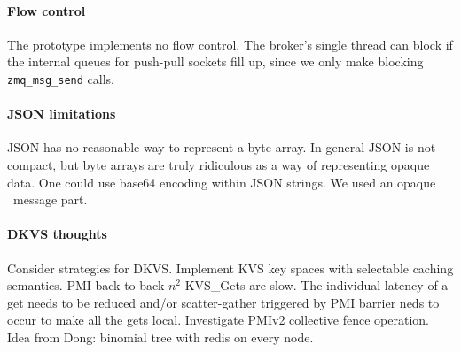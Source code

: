 \paragraph{Flow control}  The prototype implements no flow control.
The broker's single thread can block if the internal queues for push-pull
sockets fill up, since we only make blocking {\tt zmq\_msg\_send} calls.

\paragraph{JSON limitations}  JSON has no reasonable way to represent
a byte array.  In general JSON is not compact, but byte arrays are truly
ridiculous as a way of representing opaque data.  One could use base64
encoding within JSON strings.  We used an opaque \zMQ\ message part.

\paragraph{DKVS thoughts}  Consider strategies for DKVS.  Implement KVS
key spaces with selectable caching semantics.
PMI back to back $n^2$ KVS\_Gets are slow.  The individual latency of a get
needs to be reduced and/or scatter-gather triggered by PMI barrier neds to
occur to make all the gets local.  Investigate PMIv2 collective fence
operation.
Idea from Dong: binomial tree with redis on every node.
